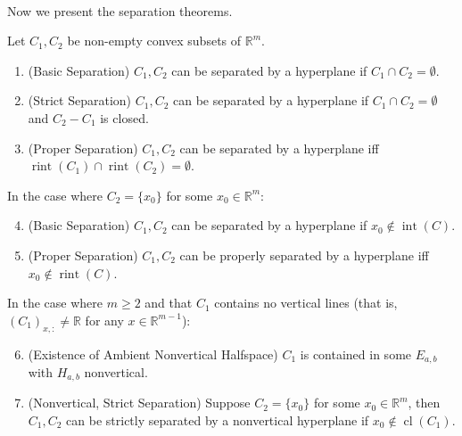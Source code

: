 \paragraph{}Now we present the separation theorems.

\begin{prop}\label{prop:014-hyperplane-sep}
	Let $C_1,C_2$ be non-empty convex subsets of $\mathbb{R}^m$.
	\begin{enumerate}[label=(\alph*)]
		\item (Basic Separation) $C_1,C_2$ can be separated by a hyperplane if $C_1\cap C_2=\emptyset$.
		\item (Strict Separation) $C_1,C_2$ can be separated by a hyperplane if $C_1\cap C_2=\emptyset$ and $C_2-C_1$ is closed.
		\item (Proper Separation) $C_1,C_2$ can be separated by a hyperplane iff $\operatorname{rint}(C_1)\cap \operatorname{rint}(C_2)=\emptyset$.
	\end{enumerate}
	In the case where $C_2=\{x_0\}$ for some $x_0\in \mathbb{R}^m$:
	\begin{enumerate}[label=(\alph*)]
		\setcounter{enumi}{3}
		\item (Basic Separation) $C_1,C_2$ can be separated by a hyperplane if $x_0\notin \operatorname{int}(C)$.
		\item (Proper Separation) $C_1,C_2$ can be properly separated by a hyperplane iff $x_0\notin \operatorname{rint}(C)$.
	\end{enumerate}
	In the case where $m\geq 2$ and that $C_1$ contains no vertical lines (that is, $(C_{1})_{x,:}\neq \mathbb{R}$ for any $x\in \mathbb{R}^{m-1}$):
	\begin{enumerate}[label=(\alph*)]
		\setcounter{enumi}{5}
		\item (Existence of Ambient Nonvertical Halfspace) $C_1$ is contained in some $E_{a,b}$ with $H_{a,b}$ nonvertical.
		\item (Nonvertical, Strict Separation) Suppose $C_2=\{x_0\}$ for some $x_0\in \mathbb{R}^m$, then $C_1,C_2$ can be strictly separated by a nonvertical hyperplane if $x_0\notin \operatorname{cl}(C_1)$.
	\end{enumerate}
\end{prop}

